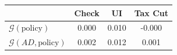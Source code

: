 \begin{tabular}{@{}lccc@{}} 
\toprule 
                          & Check      & UI    & Tax Cut    \\  \midrule 
$\mathcal{G}(\text{policy})$ & 0.000  & 0.010  & -0.000     \\ 
$\mathcal{G}(AD,\text{policy})$ & 0.002  & 0.012  & 0.001     \\ 
\end{tabular}  
